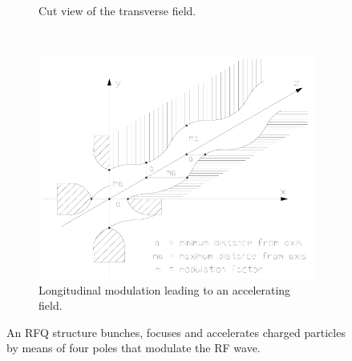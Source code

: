 \begin{figure}[!ht]
\begin{subfigure}[t]{.3\textwidth}
    \caption{Cut view of the transverse field.}
    \label{chap2:fig:RFQ_a}
  \end{subfigure}
  ~
  \begin{subfigure}[t]{0.3\textwidth}
    \includegraphics[width=\textwidth]{02_BeamDiag/figures/fig000_RFQ_b}
    \caption{Longitudinal modulation leading to an accelerating field.}
    \label{chap2:fig:RFQ_b}
  \end{subfigure}

  \caption[An RFQ structure bunches, focuses and accelerates charged particles by means of four poles that modulate the RF wave.]{An RFQ structure bunches, focuses and accelerates charged particles by means of four poles that modulate the RF wave.}
  \label{chap2:fig:RFQ}
\end{figure}
